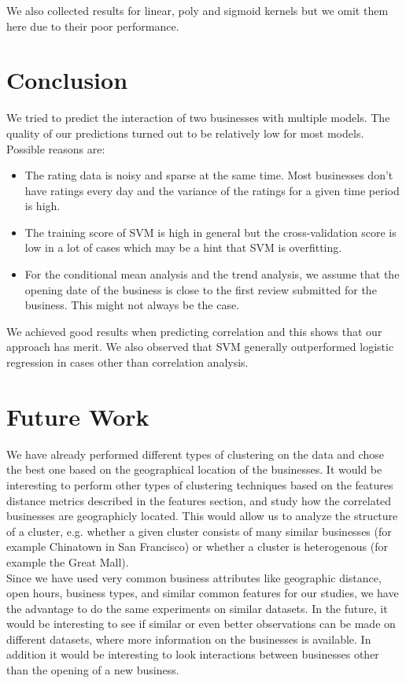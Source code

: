 \documentclass{vldb}
\begin{document}
We also collected results for linear, poly and sigmoid kernels but we omit them here due to their poor performance.

\section{Conclusion}
We tried to predict the interaction of two businesses with multiple models.
The quality of our predictions turned out to be relatively low for most models.
Possible reasons are:
\begin{itemize}
\item The rating data is noisy and sparse at the same time. Most businesses don't have ratings every day and the variance of the ratings for a given time period is high.
\item The training score of SVM is high in general but the cross-validation score is low in a lot of cases which may be a hint that SVM is overfitting.
\item For the conditional mean analysis and the trend analysis, we assume that the opening date of the business is close to the first review submitted for the business. This might not always be the case.
\end{itemize}

We achieved good results when predicting correlation and this shows that our approach has merit.
We also observed that SVM generally outperformed logistic regression in cases other than correlation analysis.

\section{Future Work}
We have already performed different types of clustering on the data and chose the best one based on the geographical location of the businesses. It would be interesting to perform other types of clustering techniques based on the features distance metrics described in the features section, and study how the correlated businesses are geographicly located. This would allow us to analyze the structure of a cluster, e.g. whether a given cluster consists of many similar businesses (for example Chinatown in San Francisco) or whether a cluster is heterogenous (for example the Great Mall).\\
Since we have used very common business attributes like geographic distance, open hours, business types, and similar common features for our studies, we have the advantage to do the same experiments on similar datasets. In the future, it would be interesting to see if similar or even better observations can be made on different datasets, where more information on the businesses is available. In addition it would be interesting to look interactions between businesses other than the opening of a new business.


\end{document}
